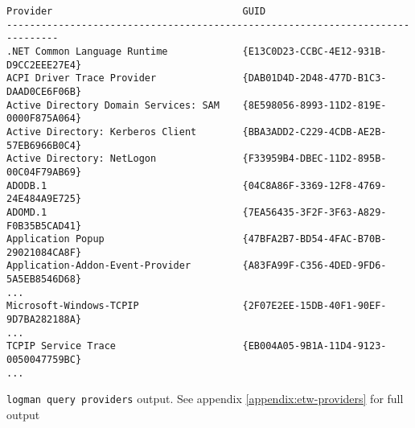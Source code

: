 \documentclass{report}
\begin{document}
\begin{listing}[H]
\begin{verbatim}
Provider                                 GUID
-------------------------------------------------------------------------------
.NET Common Language Runtime             {E13C0D23-CCBC-4E12-931B-D9CC2EEE27E4}
ACPI Driver Trace Provider               {DAB01D4D-2D48-477D-B1C3-DAAD0CE6F06B}
Active Directory Domain Services: SAM    {8E598056-8993-11D2-819E-0000F875A064}
Active Directory: Kerberos Client        {BBA3ADD2-C229-4CDB-AE2B-57EB6966B0C4}
Active Directory: NetLogon               {F33959B4-DBEC-11D2-895B-00C04F79AB69}
ADODB.1                                  {04C8A86F-3369-12F8-4769-24E484A9E725}
ADOMD.1                                  {7EA56435-3F2F-3F63-A829-F0B35B5CAD41}
Application Popup                        {47BFA2B7-BD54-4FAC-B70B-29021084CA8F}
Application-Addon-Event-Provider         {A83FA99F-C356-4DED-9FD6-5A5EB8546D68}
...
Microsoft-Windows-TCPIP                  {2F07E2EE-15DB-40F1-90EF-9D7BA282188A}
...
TCPIP Service Trace                      {EB004A05-9B1A-11D4-9123-0050047759BC}
...
\end{verbatim}
\caption{\texttt{logman query providers} output. See appendix \ref{appendix:etw-providers} for full output}
\label{listing:etw:provider:logman}
\end{listing}
\end{document}
